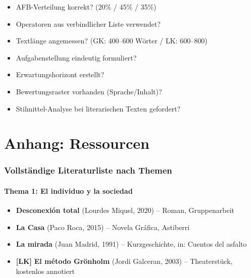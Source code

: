 \documentclass[11pt,a4paper]{article}
\newcommand{\lmark}{\textcolor{accentorange}{\textbf{[LK]}}}
\newcommand{\checkbox}{$\square$}
\begin{document}
\vspace{0.5cm}

\begin{checklistbox}
\begin{itemize}[leftmargin=0.5cm, label=\checkbox]
\item AFB-Verteilung korrekt? (20\% / 45\% / 35\%)
\item Operatoren aus verbindlicher Liste verwendet?
\item Textlänge angemessen? (GK: 400--600 Wörter / LK: 600--800)
\item Aufgabenstellung eindeutig formuliert?
\item Erwartungshorizont erstellt?
\item Bewertungsraster vorhanden (Sprache/Inhalt)?
\item Stilmittel-Analyse bei literarischen Texten gefordert?
\end{itemize}
\end{checklistbox}

\newpage
\part*{Anhang: Ressourcen}

\section{Vollständige Literaturliste nach Themen}

\subsection{Thema 1: El individuo y la sociedad}
\begin{itemize}[leftmargin=0.5cm, itemsep=2pt]
\item \textbf{Desconexión total} (Lourdes Miquel, 2020) -- Roman, Gruppenarbeit
\item \textbf{La Casa} (Paco Roca, 2015) -- Novela Gráfica, Astiberri
\item \textbf{La mirada} (Juan Madrid, 1991) -- Kurzgeschichte, in: Cuentos del asfalto
\item \lmark{} \textbf{El método Grönholm} (Jordi Galceran, 2003) -- Theaterstück, kostenlos annotiert
\end{itemize}
\end{document}

